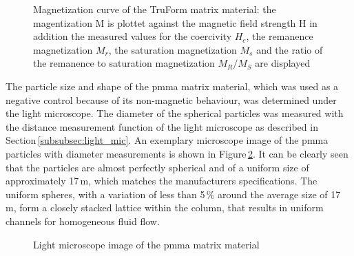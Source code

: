\begin{figure}[h]
\centering

\caption[Magnetization curve of the TruForm matrix material]{Magnetization curve of the TruForm matrix material: the magentization M is plottet against the magnetic field strength H in addition the measured values for the coercivity $H_{c}$, the remanence magnetization $M_{r}$, the saturation magnetization $M_{s}$ and the ratio of the remanence to saturation magnetization $M_{R}/M_{S}$ are displayed
\label{fig:Prax_hyst}
}
\end{figure}

The particle size and shape of the \gls{pmma} matrix material, which was used as a negative control because of its non-magnetic behaviour, was determined under the light microscope. The diameter of the spherical particles was measured with the distance measurement function of the light microscope as described in Section\,\ref{subsubsec:light_mic}. An exemplary microscope image of the \gls{pmma} particles with diameter measurements is shown in Figure\,\ref{fig:PMMA}. It can be clearly seen that the particles are almost perfectly spherical and of a uniform size of approximately 17\,\textmu m, which matches the manufacturers specifications. The uniform spheres, with a variation of less than 5\,\% around the average size of 17\,\textmu m, form a closely stacked lattice within the column, that results in uniform channels for homogeneous fluid flow.

\begin{figure}[h]
\centering

\caption[Light microscope image of \gls{pmma}]{Light microscope image of the \gls{pmma} matrix material
\label{fig:PMMA}
}
\end{figure}

